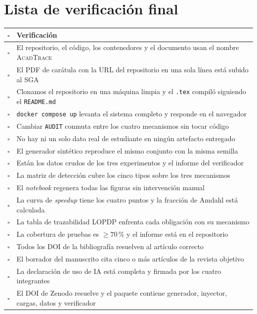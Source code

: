 \documentclass[11pt,a4paper]{article}
\begin{document}
\section{Lista de verificación final}

\begin{center}
	\small
	\begin{tabular}{@{}p{0.7cm}p{14.3cm}@{}}
		\toprule
		\textbf{$\square$} & \textbf{Verificación} \\
		\midrule
		$\square$ & El repositorio, el código, los contenedores y el documento usan el nombre \textsc{AcadTrace} \\
		$\square$ & El PDF de carátula con la URL del repositorio en una sola línea está subido al SGA \\
		$\square$ & Clonamos el repositorio en una máquina limpia y el \texttt{.tex} compiló siguiendo el \texttt{README.md} \\
		$\square$ & \texttt{docker compose up} levanta el sistema completo y responde en el navegador \\
		$\square$ & Cambiar \texttt{AUDIT} conmuta entre los cuatro mecanismos sin tocar código \\
		$\square$ & No hay ni un solo dato real de estudiante en ningún artefacto entregado \\
		$\square$ & El generador sintético reproduce el mismo conjunto con la misma semilla \\
		$\square$ & Están los datos crudos de los tres experimentos y el informe del verificador \\
		$\square$ & La matriz de detección cubre los cinco tipos sobre los tres mecanismos \\
		$\square$ & El \emph{notebook} regenera todas las figuras sin intervención manual \\
		$\square$ & La curva de \emph{speedup} tiene los cuatro puntos y la fracción de Amdahl está calculada \\
		$\square$ & La tabla de trazabilidad LOPDP enfrenta cada obligación con su mecanismo \\
		$\square$ & La cobertura de pruebas es $\geq 70\,\%$ y el informe está en el repositorio \\
		$\square$ & Todos los DOI de la bibliografía resuelven al artículo correcto \\
		$\square$ & El borrador del manuscrito cita cinco o más artículos de la revista objetivo \\
		$\square$ & La declaración de uso de IA está completa y firmada por los cuatro integrantes \\
		$\square$ & El DOI de Zenodo resuelve y el paquete contiene generador, inyector, cargas, datos y verificador \\
		\bottomrule
	\end{tabular}
\end{center}
\end{document}
